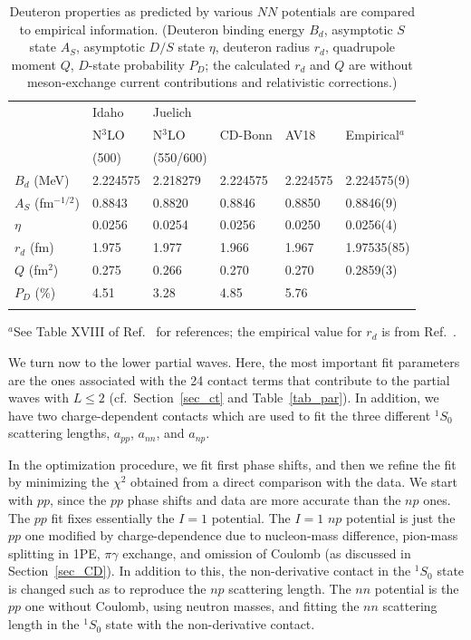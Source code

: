 \documentclass[sort&compress,preprint,3p]{elsarticle}
\begin{document}
\begin{table}[b]
\small
\caption{Deuteron properties as predicted by various $NN$
potentials are compared to empirical information.
(Deuteron binding energy $B_d$, asymptotic $S$ state $A_S$,
asymptotic $D/S$ state $\eta$, deuteron radius $r_d$,
quadrupole moment $Q$, $D$-state probability $P_D$; the calculated
$r_d$ and $Q$ are without meson-exchange current contributions
and relativistic corrections.)
\label{tab_deu}}
\smallskip
\begin{tabular*}{\textwidth}{@{\extracolsep{\fill}}llllll}
\hline 
\hline 
\noalign{\smallskip}
 & Idaho & Juelich \\
 & N$^3$LO~\cite{EM03} & N$^3$LO~\cite{EGM05} & CD-Bonn\cite{Mac01}
 & AV18\cite{WSS95} & Empirical$^a$ \\
 & (500) & (550/600) \\
\hline
\noalign{\smallskip}
$B_d$ (MeV) &
 2.224575& 2.218279&
 2.224575 & 2.224575 & 2.224575(9) \\
$A_S$ (fm$^{-1/2}$) &
 0.8843& 0.8820 &
0.8846 & 0.8850 & 0.8846(9)  \\
$\eta$         & 
 0.0256& 0.0254&
0.0256& 0.0250&0.0256(4) \\
$r_d$ (fm)   &
 1.975& 1.977&
 1.966 &
 1.967 &
 1.97535(85) \\
$Q$ (fm$^2$) &
 0.275& 0.266&
 0.270 & 
 0.270 &
 0.2859(3)  \\
$P_D$ (\%)    & 
 4.51& 3.28&
4.85 & 5.76  \\
\hline
\hline
\noalign{\smallskip}
\end{tabular*}
\footnotesize
$^a$See Table XVIII of Ref.~\cite{Mac01} for references;
the empirical value for $r_d$ is from Ref.~\cite{Hub98}.\\
\end{table}




We turn now to the lower partial waves.
Here, the most important fit parameters are the ones associated
with the 24 contact terms that contribute to the partial waves
with $L\leq 2$ (cf.\ Section~\ref{sec_ct} and Table~\ref{tab_par}). 
In addition, we have two charge-dependent
contacts which are used to fit the
three different $^1S_0$ scattering 
lengths, $a_{pp}$, $a_{nn}$, and $a_{np}$.

In the optimization procedure, we fit first phase shifts,
and then we refine the fit by minimizing the
$\chi^2$ obtained from a direct comparison with the data.
We start with $pp$, since the $pp$ phase shifts and data are more
accurate than the $np$ ones. The $pp$ fit fixes essentially the $I=1$ potential.
The $I=1$ $np$ potential is just the $pp$ one modified
by charge-dependence due to nucleon-mass difference, pion-mass splitting in 1PE,
$\pi\gamma$ exchange, and omission of Coulomb (as discussed in Section~\ref{sec_CD}). 
In addition to this, the non-derivative contact in the $^1S_0$ state is changed such as to 
reproduce the $np$  scattering length.
The $nn$ potential is the $pp$ one without Coulomb, using neutron masses, and 
fitting the $nn$ scattering length in the $^1S_0$ state with the non-derivative contact.
\end{document}
